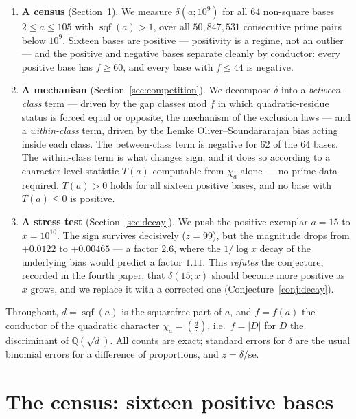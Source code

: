 \documentclass[11pt,reqno]{amsart}
\theoremstyle{plain}
\theoremstyle{definition}
\DeclareMathOperator{\sqf}{sqf}
\newcommand{\Q}{\mathbb{Q}}
\begin{document}
\begin{enumerate}
\item \textbf{A census} (Section~\ref{sec:census}). We measure $\delta(a;10^9)$
      for all $64$ non-square bases $2 \le a \le 105$ with $\sqf(a) > 1$,
      over all $50{,}847{,}531$ consecutive prime pairs below $10^9$.
      Sixteen bases are positive --- positivity is a regime, not an outlier
      --- and the positive and negative bases separate cleanly by conductor:
      every positive base has $f \ge 60$, and every base with $f \le 44$ is
      negative.
\item \textbf{A mechanism} (Section~\ref{sec:competition}). We decompose
      $\delta$ into a \emph{between-class} term --- driven by the gap classes
      mod $f$ in which quadratic-residue status is forced equal or opposite,
      the mechanism of the exclusion laws --- and a \emph{within-class} term,
      driven by the Lemke Oliver--Soundararajan bias
      \cite{LOS2016} acting inside each class. The between-class term
      is negative for $62$ of the $64$ bases. The within-class term is what
      changes sign, and it does so according to a character-level statistic
      $T(a)$ computable from $\chi_a$ alone --- no prime data required.
      $T(a) > 0$ holds for all sixteen positive bases, and no base with
      $T(a) \le 0$ is positive.
\item \textbf{A stress test} (Section~\ref{sec:decay}). We push the positive
      exemplar $a = 15$ to $x = 10^{10}$. The sign survives decisively
      ($z = 99$), but the magnitude drops from $+0.0122$ to $+0.00465$ ---
      a factor $2.6$, where the $1/\log x$ decay of the underlying bias
      would predict a factor $1.11$. This \emph{refutes} the conjecture,
      recorded in the fourth paper, that $\delta(15;x)$ should become more
      positive as $x$ grows, and we replace it with a corrected one
      (Conjecture~\ref{conj:decay}).
\end{enumerate}

Throughout, $d = \sqf(a)$ is the squarefree part of $a$, and
$f = f(a)$ the conductor of the quadratic character
$\chi_a = \left(\frac{d}{\cdot}\right)$, i.e.\ $f = |D|$ for $D$ the
discriminant of $\Q(\sqrt{d})$. All counts are exact; standard errors for
$\delta$ are the usual binomial errors for a difference of proportions, and
$z = \delta/\mathrm{se}$.

\section{The census: sixteen positive bases}
\label{sec:census}
\end{document}
